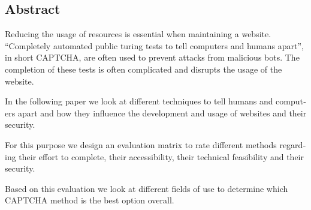 

\begin{otherlanguage}{american}
	\chapter*{Abstract}
	Reducing the usage of resources is essential when maintaining a website. 
	“Completely automated public turing tests to tell computers and humans apart”, in short CAPTCHA, are often used to prevent attacks from malicious bots. 
	The completion of these tests is often complicated and disrupts the usage of the website. 

	In the following paper we look at different techniques to tell humans and computers apart and how they influence the development and usage of websites and their security. 
	
	For this purpose we design an evaluation matrix to rate different methods regarding their effort to complete, their accessibility, their technical feasibility and their security. 
	
	Based on this evaluation we look at different fields of use to determine which CAPTCHA method is the best option overall.

\end{otherlanguage}
